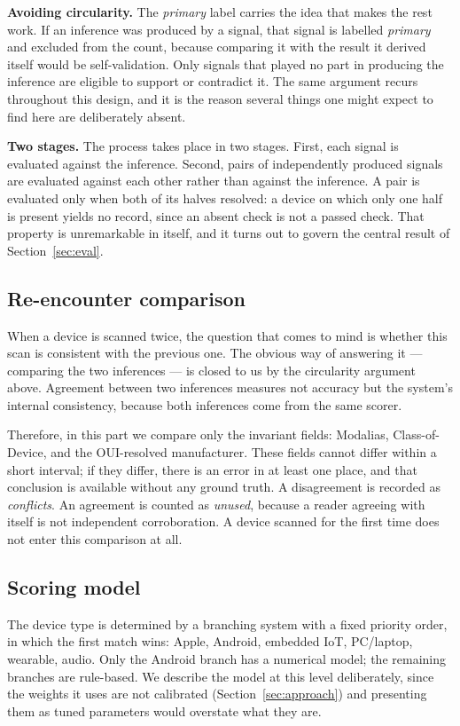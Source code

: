 \documentclass[conference]{IEEEtran}
\begin{document}
\textbf{Avoiding circularity.} The \emph{primary} label carries the idea that
makes the rest work. If an inference was produced by a signal, that signal is
labelled \emph{primary} and excluded from the count, because comparing it with
the result it derived itself would be self-validation. Only signals that
played no part in producing the inference are eligible to support or
contradict it. The same argument recurs throughout this design, and it is the
reason several things one might expect to find here are deliberately absent.

\textbf{Two stages.} The process takes place in two stages. First, each signal
is evaluated against the inference. Second, pairs of independently produced
signals are evaluated against each other rather than against the inference. A
pair is evaluated only when both of its halves resolved: a device on which
only one half is present yields no record, since an absent check is not a
passed check. That property is unremarkable in itself, and it turns out to
govern the central result of Section~\ref{sec:eval}.

\subsection{Re-encounter comparison}\label{sec:reencounter}
When a device is scanned twice, the question that comes to mind is whether
this scan is consistent with the previous one. The obvious way of answering it
--- comparing the two inferences --- is closed to us by the circularity
argument above. Agreement between two inferences measures not accuracy but the
system's internal consistency, because both inferences come from the same
scorer.

Therefore, in this part we compare only the invariant fields: Modalias,
Class-of-Device, and the OUI-resolved manufacturer. These fields cannot differ
within a short interval; if they differ, there is an error in at least one
place, and that conclusion is available without any ground truth. A
disagreement is recorded as \emph{conflicts}. An agreement is counted as
\emph{unused}, because a reader agreeing with itself is not independent
corroboration. A device scanned for the first time does not enter this
comparison at all.

\subsection{Scoring model}\label{sec:scoring}
The device type is determined by a branching system with a fixed priority
order, in which the first match wins: Apple, Android, embedded IoT,
PC/laptop, wearable, audio. Only the Android branch has a numerical model; the
remaining branches are rule-based. We describe the model at this level
deliberately, since the weights it uses are not calibrated
(Section~\ref{sec:approach}) and presenting them as tuned parameters would
overstate what they are.
\end{document}
